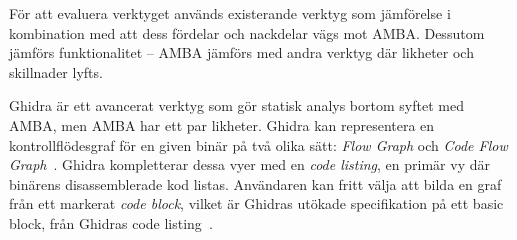 



För att evaluera verktyget används existerande verktyg som jämförelse i
kombination med att dess fördelar och nackdelar vägs mot AMBA. Dessutom jämförs
funktionalitet -- AMBA jämförs med andra verktyg där likheter
och skillnader lyfts.

Ghidra är ett avancerat verktyg som gör statisk analys bortom syftet med AMBA,
men AMBA har ett par likheter. Ghidra kan representera en
kontrollflödesgraf för en given binär på två olika sätt: \textit{Flow
Graph} och \textit{Code Flow Graph}~\cite{ghidra_website}. Ghidra kompletterar dessa vyer
med en \textit{code listing}, en primär vy där binärens
disassemblerade kod listas. Användaren kan fritt välja att bilda en
graf från ett markerat \textit{code block}, vilket är Ghidras utökade
specifikation på ett basic block, från Ghidras code
listing~\cite{ghidra_website}. 







